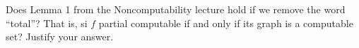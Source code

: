 \begin{problem}
  Does Lemma 1 from the Noncomputability lecture hold if we  remove
  the word ``total''?  That is, si $f$ partial computable
  if and only if its graph is a computable set?
  Justify your answer.
  \begin{answer}
    
  \end{answer}
\end{problem}
